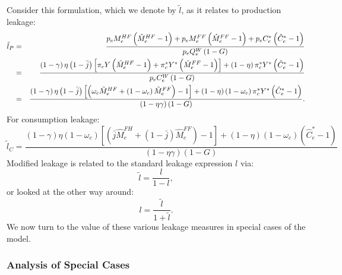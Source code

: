 \documentclass[notitlepage,12pt]{article}
\begin{document}
Consider this formulation, which we denote by $\tilde{l}$, as it relates to
production leakage:%
\begin{eqnarray*}
\tilde{l}_{P} &=&\frac{p_{e}M_{e}^{HF}\left( \hat{M}_{e}^{HF}-1\right)
+p_{e}M_{e}^{FF}\left( \hat{M}_{e}^{FF}-1\right) +p_{e}C_{e}^{\ast }\left( 
\hat{C}_{e}^{\ast }-1\right) }{p_{e}Q_{e}^{W}\left( 1-G\right) } \\
&=&\frac{\left( 1-\gamma \right) \eta \left( 1-\bar{j}\right) \left[ \pi
_{c}Y\left( \hat{M}_{e}^{HF}-1\right) +\pi _{c}^{\ast }Y^{\ast }\left( \hat{M%
}_{e}^{FF}-1\right) \right] +\left( 1-\eta \right) \pi _{c}^{\ast }Y^{\ast
}\left( \hat{C}_{e}^{\ast }-1\right) }{p_{e}C_{e}^{W}\left( 1-G\right) } \\
&=&\frac{\left( 1-\gamma \right) \eta \left( 1-\bar{j}\right) \left[ \left(
\omega _{c}\hat{M}_{e}^{HF}+\left( 1-\omega _{c}\right) \hat{M}%
_{e}^{FF}\right) -1\right] +\left( 1-\eta \right) \left( 1-\omega
_{c}\right) \pi _{c}^{\ast }Y^{\ast }\left( \hat{C}_{e}^{\ast }-1\right) }{%
\left( 1-\eta \gamma \right) \left( 1-G\right) }.
\end{eqnarray*}%
For consumption leakage:%
\begin{equation*}
\tilde{l}_{C}=\frac{\left( 1-\gamma \right) \eta \left( 1-\omega _{c}\right) %
\left[ \left( \bar{j}\hat{M}_{e}^{FH}+\left( 1-\bar{j}\right) \hat{M}%
_{e}^{FF}\right) -1\right] +\left( 1-\eta \right) \left( 1-\omega
_{c}\right) \left( \hat{C}_{e}^{\ast }-1\right) }{\left( 1-\eta \gamma
\right) \left( 1-G\right) }
\end{equation*}%
Modified leakage is related to the standard leakage expression $l$ via:%
\begin{equation}
\tilde{l}=\frac{l}{1-l},  \label{ltilde vs. l}
\end{equation}%
or looked at the other way around:%
\begin{equation*}
l=\frac{\tilde{l}}{1+\tilde{l}}.
\end{equation*}%
We now turn to the value of these various leakage measures in special cases
of the model.

\subsubsection{Analysis of Special Cases}
\end{document}
